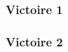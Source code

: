 
\begin{frame}
    \frametitle{Victoire 1}

\end{frame}

\begin{frame}
    \frametitle{Victoire 2}
\end{frame}
